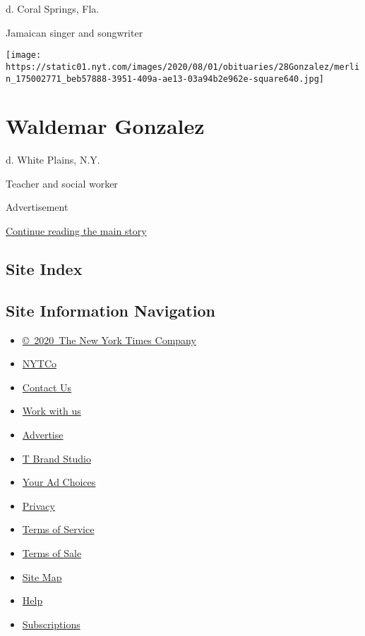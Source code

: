 d. Coral Springs, Fla.

Jamaican singer and songwriter

\texttt{[image: https://static01.nyt.com/images/2020/08/01/obituaries/28Gonzalez/merlin\_175002771\_beb57888-3951-409a-ae13-03a94b2e962e-square640.jpg]}

\hypertarget{waldemar-gonzalez}{%
\section{Waldemar Gonzalez}\label{waldemar-gonzalez}}

d. White Plains, N.Y.

Teacher and social worker

Advertisement

\protect\hyperlink{after-bottom}{Continue reading the main story}

\hypertarget{site-index}{%
\subsection{Site Index}\label{site-index}}

\hypertarget{site-information-navigation}{%
\subsection{Site Information
Navigation}\label{site-information-navigation}}

\begin{itemize}
\tightlist
\item
  \href{https://help.nytimes.com/hc/en-us/articles/115014792127-Copyright-notice}{©~2020~The
  New York Times Company}
\end{itemize}

\begin{itemize}
\tightlist
\item
  \href{https://www.nytco.com/}{NYTCo}
\item
  \href{https://help.nytimes.com/hc/en-us/articles/115015385887-Contact-Us}{Contact
  Us}
\item
  \href{https://www.nytco.com/careers/}{Work with us}
\item
  \href{https://nytmediakit.com/}{Advertise}
\item
  \href{http://www.tbrandstudio.com/}{T Brand Studio}
\item
  \href{https://www.nytimes.com/privacy/cookie-policy\#how-do-i-manage-trackers}{Your
  Ad Choices}
\item
  \href{https://www.nytimes.com/privacy}{Privacy}
\item
  \href{https://help.nytimes.com/hc/en-us/articles/115014893428-Terms-of-service}{Terms
  of Service}
\item
  \href{https://help.nytimes.com/hc/en-us/articles/115014893968-Terms-of-sale}{Terms
  of Sale}
\item
  \href{https://spiderbites.nytimes.com}{Site Map}
\item
  \href{https://help.nytimes.com/hc/en-us}{Help}
\item
  \href{https://www.nytimes.com/subscription?campaignId=37WXW}{Subscriptions}
\end{itemize}
